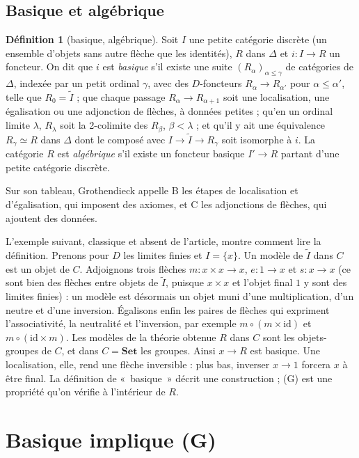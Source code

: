 \documentclass[11pt,a4paper]{amsart}
\theoremstyle{definition}
\newtheorem{definition}{Définition}
\theoremstyle{plain}
\theoremstyle{remark}
\newcommand{\Set}{\mathbf{Set}}
\newcommand{\It}{\widetilde I}
\begin{document}
\subsection{Basique et algébrique}

\begin{definition}[basique, algébrique]
Soit $I$ une petite catégorie discrète (un ensemble d'objets sans autre flèche que les identités), $R$ dans $\Delta$ et $i\colon I\to R$ un foncteur. On dit que $i$ est \emph{basique} s'il existe une suite $(R_\alpha)_{\alpha\le\gamma}$ de catégories de $\Delta$, indexée par un petit ordinal $\gamma$, avec des $D$-foncteurs $R_\alpha\to R_{\alpha'}$ pour $\alpha\le\alpha'$, telle que $R_0=\It$ ; que chaque passage $R_\alpha\to R_{\alpha+1}$ soit une localisation, une égalisation ou une adjonction de flèches, à données petites ; qu'en un ordinal limite $\lambda$, $R_\lambda$ soit la 2-colimite des $R_\beta$, $\beta<\lambda$ ; et qu'il y ait une équivalence $R_\gamma\simeq R$ dans $\Delta$ dont le composé avec $I\to\It\to R_\gamma$ soit isomorphe à $i$. La catégorie $R$ est \emph{algébrique} s'il existe un foncteur basique $I'\to R$ partant d'une petite catégorie discrète.
\end{definition}

Sur son tableau, Grothendieck appelle B les étapes de localisation et d'égalisation, qui imposent des axiomes, et C les adjonctions de flèches, qui ajoutent des données.

L'exemple suivant, classique et absent de l'article, montre comment lire la définition. Prenons pour $D$ les limites finies et $I=\{x\}$. Un modèle de $\It$ dans $C$ est un objet de $C$. Adjoignons trois flèches $m\colon x\times x\to x$, $e\colon 1\to x$ et $s\colon x\to x$ (ce sont bien des flèches entre objets de $\It$, puisque $x\times x$ et l'objet final $1$ y sont des limites finies) : un modèle est désormais un objet muni d'une multiplication, d'un neutre et d'une inversion. Égalisons enfin les paires de flèches qui expriment l'associativité, la neutralité et l'inversion, par exemple $m\circ(m\times\mathrm{id})$ et $m\circ(\mathrm{id}\times m)$. Les modèles de la théorie obtenue $R$ dans $C$ sont les objets-groupes de $C$, et dans $C=\Set$ les groupes. Ainsi $x\to R$ est basique. Une localisation, elle, rend une flèche inversible : plus bas, inverser $x\to1$ forcera $x$ à être final.
La définition de «~basique~» décrit une construction ; (G) est une propriété qu'on vérifie à l'intérieur de $R$.

\section{Basique implique (G)}\label{sec:basicG}
\end{document}
